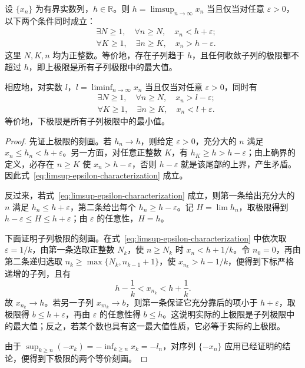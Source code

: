 \begin{theorem}[上下极限的等价刻画]
\label{thm:liminf-limsup-characterizations}
设 $\{x_n\}$ 为有界实数列，$h\in\mathbb{R}$。则 $h=\limsup_{n\to\infty}x_n$ 当且仅当对任意 $\varepsilon>0$，以下两个条件同时成立：
\begin{equation}
    \begin{aligned}
        &\exists N\geq1,\quad\forall n\geq N,\quad x_n<h+\varepsilon;\\
        &\forall K\geq1,\quad\exists n\geq K,\quad x_n>h-\varepsilon.
    \end{aligned}
    \label{eq:limsup-epsilon-characterization}
\end{equation}
这里 $N,K,n$ 均为正整数。等价地，存在子列趋于 $h$，且任何收敛子列的极限都不超过 $h$，即上极限是所有子列极限中的最大值。

相应地，对实数 $l$，$l=\liminf_{n\to\infty}x_n$ 当且仅当对任意 $\varepsilon>0$，同时有
\begin{equation}
    \begin{aligned}
        &\exists N\geq1,\quad\forall n\geq N,\quad x_n>l-\varepsilon;\\
        &\forall K\geq1,\quad\exists n\geq K,\quad x_n<l+\varepsilon.
    \end{aligned}
    \label{eq:liminf-epsilon-characterization}
\end{equation}
等价地，下极限是所有子列极限中的最小值。
\end{theorem}

\begin{proof}
先证上极限的刻画。若 $h_n\to h$，则给定 $\varepsilon>0$，充分大的 $n$ 满足 $x_n\leq h_n<h+\varepsilon$。另一方面，对任意正整数 $K$，有 $h_K\geq h>h-\varepsilon$；由上确界的定义，必存在 $n\geq K$ 使 $x_n>h-\varepsilon$，否则 $h-\varepsilon$ 就是该尾部的上界，产生矛盾。因此式~\eqref{eq:limsup-epsilon-characterization} 成立。

反过来，若式~\eqref{eq:limsup-epsilon-characterization} 成立，则第一条给出充分大的 $n$ 满足 $h_n\leq h+\varepsilon$，第二条给出每个 $h_n\geq h-\varepsilon$。记 $H=\lim h_n$，取极限得到 $h-\varepsilon\leq H\leq h+\varepsilon$；由 $\varepsilon$ 的任意性，$H=h$。

下面证明子列极限的刻画。在式~\eqref{eq:limsup-epsilon-characterization} 中依次取 $\varepsilon=1/k$，由第一条选取正整数 $N_k$，使 $n\geq N_k$ 时 $x_n<h+1/k$。令 $n_0=0$，再由第二条递归选取 $n_k\geq\max\{N_k,n_{k-1}+1\}$，使 $x_{n_k}>h-1/k$，便得到下标严格递增的子列，且有
\[
    h-\frac1k<x_{n_k}<h+\frac1k.
\]
故 $x_{n_k}\to h$。若另一子列 $x_{m_k}\to b$，则第一条保证它充分靠后的项小于 $h+\varepsilon$，取极限得 $b\leq h+\varepsilon$，再由 $\varepsilon$ 的任意性得 $b\leq h$。这说明实际的上极限是子列极限中的最大值；反之，若某个数也具有这一最大值性质，它必等于实际的上极限。

由于 $\sup_{k\geq n}(-x_k)=-\inf_{k\geq n}x_k=-l_n$，对序列 $\{-x_n\}$ 应用已经证明的结论，便得到下极限的两个等价刻画。
\end{proof}

